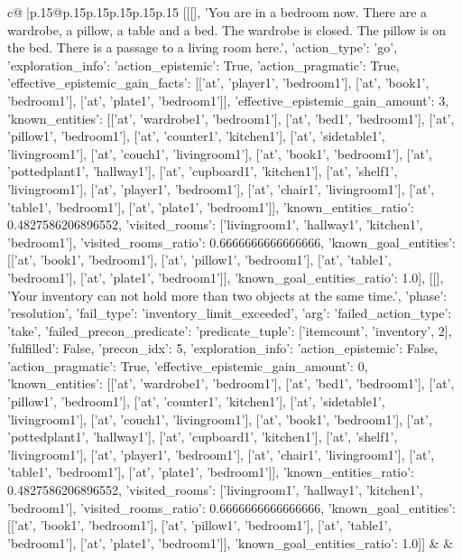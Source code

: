 \documentclass{article}
\begin{document}
{\begin{supertabular}{c@{$\;$}|p{.15\linewidth}@{}p{.15\linewidth}p{.15\linewidth}p{.15\linewidth}p{.15\linewidth}p{.15\linewidth}}
{{{	 [[[], 'You are in a bedroom now. There are a wardrobe, a pillow, a table and a bed. The wardrobe is closed. The pillow is on the bed. There is a passage to a living room here.', {'action_type': 'go', 'exploration_info': {'action_epistemic': True, 'action_pragmatic': True, 'effective_epistemic_gain_facts': [['at', 'player1', 'bedroom1'], ['at', 'book1', 'bedroom1'], ['at', 'plate1', 'bedroom1']], 'effective_epistemic_gain_amount': 3, 'known_entities': [['at', 'wardrobe1', 'bedroom1'], ['at', 'bed1', 'bedroom1'], ['at', 'pillow1', 'bedroom1'], ['at', 'counter1', 'kitchen1'], ['at', 'sidetable1', 'livingroom1'], ['at', 'couch1', 'livingroom1'], ['at', 'book1', 'bedroom1'], ['at', 'pottedplant1', 'hallway1'], ['at', 'cupboard1', 'kitchen1'], ['at', 'shelf1', 'livingroom1'], ['at', 'player1', 'bedroom1'], ['at', 'chair1', 'livingroom1'], ['at', 'table1', 'bedroom1'], ['at', 'plate1', 'bedroom1']], 'known_entities_ratio': 0.4827586206896552, 'visited_rooms': ['livingroom1', 'hallway1', 'kitchen1', 'bedroom1'], 'visited_rooms_ratio': 0.6666666666666666, 'known_goal_entities': [['at', 'book1', 'bedroom1'], ['at', 'pillow1', 'bedroom1'], ['at', 'table1', 'bedroom1'], ['at', 'plate1', 'bedroom1']], 'known_goal_entities_ratio': 1.0}}], [[], 'Your inventory can not hold more than two objects at the same time.', {'phase': 'resolution', 'fail_type': 'inventory_limit_exceeded', 'arg': {'failed_action_type': 'take', 'failed_precon_predicate': {'predicate_tuple': ['itemcount', 'inventory', 2], 'fulfilled': False, 'precon_idx': 5}}, 'exploration_info': {'action_epistemic': False, 'action_pragmatic': True, 'effective_epistemic_gain_amount': 0, 'known_entities': [['at', 'wardrobe1', 'bedroom1'], ['at', 'bed1', 'bedroom1'], ['at', 'pillow1', 'bedroom1'], ['at', 'counter1', 'kitchen1'], ['at', 'sidetable1', 'livingroom1'], ['at', 'couch1', 'livingroom1'], ['at', 'book1', 'bedroom1'], ['at', 'pottedplant1', 'hallway1'], ['at', 'cupboard1', 'kitchen1'], ['at', 'shelf1', 'livingroom1'], ['at', 'player1', 'bedroom1'], ['at', 'chair1', 'livingroom1'], ['at', 'table1', 'bedroom1'], ['at', 'plate1', 'bedroom1']], 'known_entities_ratio': 0.4827586206896552, 'visited_rooms': ['livingroom1', 'hallway1', 'kitchen1', 'bedroom1'], 'visited_rooms_ratio': 0.6666666666666666, 'known_goal_entities': [['at', 'book1', 'bedroom1'], ['at', 'pillow1', 'bedroom1'], ['at', 'table1', 'bedroom1'], ['at', 'plate1', 'bedroom1']], 'known_goal_entities_ratio': 1.0}}]] 
	  } 
	   } 
	   } 
	 & & \\ 
 

    \theutterance {}  


\end{supertabular}}
\end{document}
